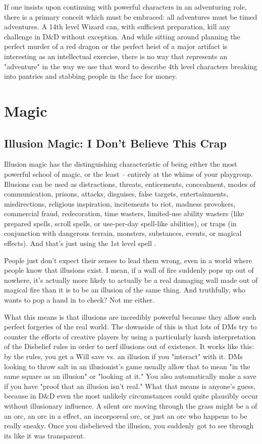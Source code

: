 If one insists upon continuing with powerful characters in an adventuring role, there is a primary conceit which must be embraced: all adventures must be timed adventures. A 14th level Wizard can, with sufficient preparation, kill any challenge in D\&D without exception. And while sitting around planning the perfect murder of a red dragon or the perfect heist of a major artifact is interesting as an intellectual exercise, there is no way that represents an "adventure" in the way we use that word to describe 4th level characters breaking into pantries and stabbing people in the face for money.


\section{Magic}

\subsection{Illusion Magic: I Don't Believe This Crap}

Illusion magic has the distinguishing characteristic of being either the most powerful school of magic, or the least -- entirely at the whims of your playgroup. Illusions can be used as distractions, threats, enticements, concealment, modes of communication, prisons, attacks, disguises, false targets, entertainments, misdirections, religious inspiration, incitements to riot, madness provokers, commercial fraud, redecoration, time wasters, limited-use ability wasters (like prepared spells, scroll spells, or use-per-day spell-like abilities), or traps (in conjunction with dangerous terrain, monsters, substances, events, or magical effects). And that's just using the 1st level spell .

People just don't expect their senses to lead them wrong, even in a world where people know that illusions exist. I mean, if a wall of fire suddenly pops up out of nowhere, it's actually more likely to actually be a real damaging wall made out of magical fire than it is to be an illusion of the same thing. And truthfully, who wants to pop a hand in to check? Not me either.

What this means is that illusions are incredibly powerful because they allow such perfect forgeries of the real world. The downside of this is that lots of DMs try to counter the efforts of creative players by using a particularly harsh interpretation of the Disbelief rules in order to nerf illusions out of existence. It works like this: by the rules, you get a Will save vs. an illusion if you "interact" with it. DMs looking to throw salt in an illusionist's game usually allow that to mean "in the same square as an illusion" or "looking at it." You also automatically make a save if you have "proof that an illusion isn't real." What that means is anyone's guess, because in D\&D even the most unlikely circumstances could quite plausibly occur without illusionary influence. A silent orc moving through the grass might be a  of an orc, an orc in a  effect, an incorporeal orc, or just an orc who happens to be really sneaky. Once you disbelieved the illusion, you suddenly got to see through its like it was transparent.

